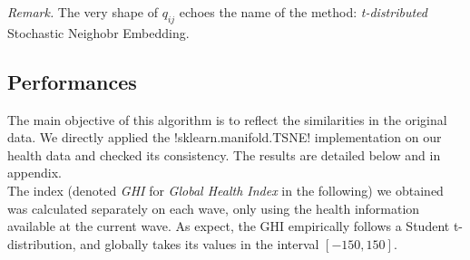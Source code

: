 \documentclass[]{article}
\begin{document}
\noindent
\textit{Remark.} The very shape of $q_{ij}$ echoes the name of the method: \textit{t-distributed} Stochastic Neighobr Embedding.

\subsection{Performances}
The main objective of this algorithm is to reflect the similarities in the original data. We directly applied the \pyth!sklearn.manifold.TSNE! implementation on our health data and checked its consistency. The results are detailed below and in appendix.\\

\noindent
The index (denoted \textit{GHI} for \textit{Global Health Index} in the following) we obtained was calculated separately on each wave, only using the health information available at the current wave. As expect, the GHI empirically follows a Student t-distribution, and globally takes its values in the interval $[-150, 150]$.\\
\end{document}
